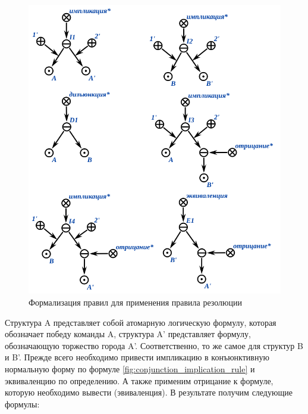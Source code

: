 \begin{figure}[H]
	\includegraphics[scale=0.8]{author/part3/figures/resolution_formulas_example.png}
	\caption{Формализация правил для применения правила резолюции}
	\label{fig:resolution_formulas}
\end{figure}

Структура A представляет собой атомарную логическую формулу, которая обозначает победу команды A, структура A' представляет формулу, обозначающую торжество города A'. Соответственно, то же самое для структур B и B'.
Прежде всего необходимо привести импликацию в конъюнктивную нормальную форму по формуле \ref{fig:conjunction_implication_rule} и эквиваленцию по определению. А также применим отрицание к формуле, которую необходимо вывести (эвиваленция). В результате получим следующие формулы:

